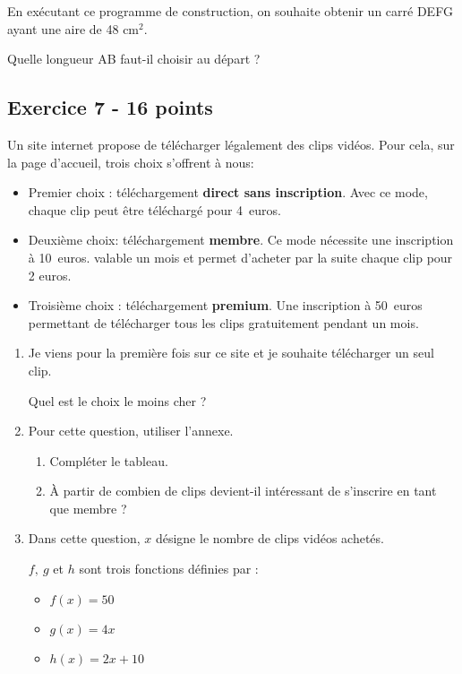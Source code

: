 {\begin{enumerate}
En exécutant ce programme de construction, on souhaite obtenir un carré DEFG ayant
une aire de 48 cm$^2$.
	
Quelle longueur AB faut-il choisir au départ ?
\end{enumerate}


\newpage

\subsection*{Exercice 7 - 16 points}

\medskip

Un site internet propose de télécharger légalement des clips vidéos. Pour cela, sur la page d'accueil, trois choix s'offrent à nous:

\setlength\parindent{8mm}
\begin{itemize}[label={$\bullet$}]
    \item Premier choix : téléchargement \textbf{direct sans inscription}. Avec ce mode, chaque clip peut être téléchargé pour 4~euros.
    \item Deuxième choix: téléchargement \textbf{membre}. Ce mode nécessite une inscription à 10~euros.
    valable un mois et permet d'acheter par la suite chaque clip pour 2 euros.
    \item Troisième choix : téléchargement \textbf{premium}. Une inscription à 50~euros permettant de télécharger tous les clips gratuitement pendant un mois.
\end{itemize}
\setlength\parindent{0mm}

\medskip

\begin{enumerate}
\item Je viens pour la première fois sur ce site et je souhaite télécharger un seul clip.

Quel est le choix le moins cher ?
\item Pour cette question, utiliser l'annexe.
	\begin{enumerate}
		\item Compléter le tableau.
		\item À partir de combien de clips devient-il intéressant de s'inscrire en tant que membre ?
	\end{enumerate}
\item Dans cette question, $x$ désigne le nombre de clips vidéos achetés.
	
$f,\: g$ et $h$ sont trois fonctions définies par :
	
\setlength\parindent{8mm}
\begin{itemize}[label={$\bullet$}]
    \item $f(x) = 50$
    \item $g(x) = 4x$
    \item $h(x) = 2x + 10$
\end{itemize}
\setlength\parindent{0mm}


\end{enumerate}}
